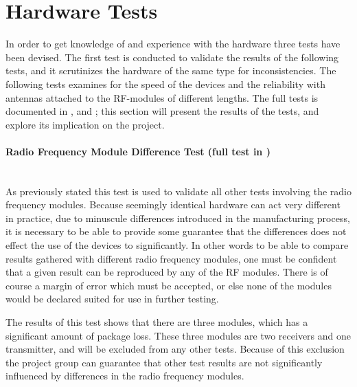 \clearpage
\section{Hardware Tests} %
\label{sec:hardware_tests}
In order to get knowledge of and experience with the hardware three tests have been devised.
The first test is conducted to validate the results of the following tests, and it scrutinizes the hardware of the same type for inconsistencies.
The following tests examines for the speed of the devices and the reliability with antennas attached to the RF-modules of different lengths.
The full tests is documented in ,  and ; this section will present the results of the tests, and explore its implication on the project.

\paragraph{Radio Frequency Module Difference Test (full test in )}%
\label{par:radio_frequency_module_difference_test}\hfill\\
As previously stated this test is used to validate all other tests involving the radio frequency modules.
Because seemingly identical hardware can act very different in practice, due to minuscule differences introduced in the manufacturing process, it is necessary to be able to provide some guarantee that the differences does not effect the use of the devices to significantly.
In other words to be able to compare results gathered with different radio frequency modules, one must be confident that a given result can be reproduced by any of the RF modules.
There is of course a margin of error which must be accepted, or else none of the modules would be declared suited for use in further testing.

The results of this test shows that there are three modules, which has a significant amount of package loss.
These three modules are two receivers and one transmitter, and will be excluded from any other tests.
Because of this exclusion the project group can guarantee that other test results are not significantly influenced by differences in the radio frequency modules. 

